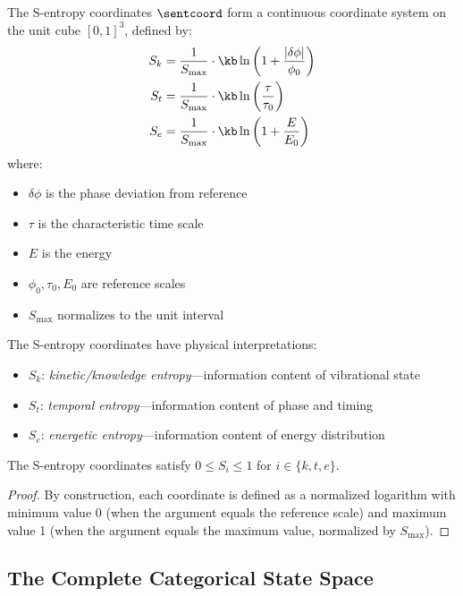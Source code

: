 \begin{definition}
\label{def:s_entropy}
The S-entropy coordinates $\sentcoord$ form a continuous coordinate system on the unit cube $[0,1]^3$, defined by:
\begin{align}
S_k &= \frac{1}{S_{\max}} \cdot \kb \ln\left(1 + \frac{|\delta\phi|}{\phi_0}\right) \label{eq:Sk}\\
S_t &= \frac{1}{S_{\max}} \cdot \kb \ln\left(\frac{\tau}{\tau_0}\right) \label{eq:St}\\
S_e &= \frac{1}{S_{\max}} \cdot \kb \ln\left(1 + \frac{E}{E_0}\right) \label{eq:Se}
\end{align}
where:
\begin{itemize}
    \item $\delta\phi$ is the phase deviation from reference
    \item $\tau$ is the characteristic time scale
    \item $E$ is the energy
    \item $\phi_0, \tau_0, E_0$ are reference scales
    \item $S_{\max}$ normalizes to the unit interval
\end{itemize}
\end{definition}

The S-entropy coordinates have physical interpretations:
\begin{itemize}
    \item $S_k$: \textit{kinetic/knowledge entropy}---information content of vibrational state
    \item $S_t$: \textit{temporal entropy}---information content of phase and timing
    \item $S_e$: \textit{energetic entropy}---information content of energy distribution
\end{itemize}

\begin{proposition}
The S-entropy coordinates satisfy $0 \leq S_i \leq 1$ for $i \in \{k, t, e\}$.
\end{proposition}

\begin{proof}
By construction, each coordinate is defined as a normalized logarithm with minimum value 0 (when the argument equals the reference scale) and maximum value 1 (when the argument equals the maximum value, normalized by $S_{\max}$).
\end{proof}

\subsection{The Complete Categorical State Space}


